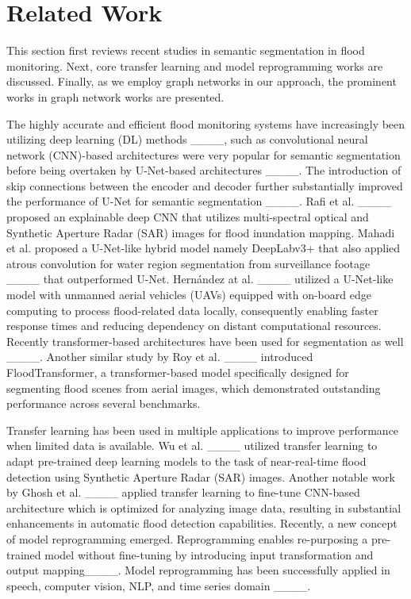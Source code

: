 \section{Related Work}
\label{sec:related}

This section first reviews recent studies in semantic segmentation in flood monitoring. Next, core transfer learning and model reprogramming works are discussed. Finally, as we employ graph networks in our approach, the prominent works in graph network works are presented.

The highly accurate and efficient flood monitoring systems have increasingly been utilizing deep learning (DL) methods ____, such as convolutional neural network (CNN)-based architectures were very popular for semantic segmentation before being overtaken by U-Net-based architectures ____. The introduction of skip connections between the encoder and decoder further substantially improved the performance of U-Net for semantic segmentation ____. Rafi et al. ____ proposed an explainable deep CNN that utilizes multi-spectral optical and Synthetic Aperture Radar (SAR) images for flood inundation mapping.  Mahadi et al. proposed a U-Net-like hybrid model namely DeepLabv3+ that also applied atrous convolution for water region segmentation from surveillance footage ____ that outperformed U-Net. Hern{\'a}ndez at al. ____ utilized a U-Net-like model with unmanned aerial vehicles (UAVs) equipped with on-board edge computing to process flood-related data locally, consequently enabling faster response times and reducing dependency on distant computational resources. Recently transformer-based architectures have been used for segmentation as well ____. Another similar study by Roy et al. ____ introduced FloodTransformer, a transformer-based model specifically designed for segmenting flood scenes from aerial images, which demonstrated outstanding performance across several benchmarks.  

Transfer learning has been used in multiple applications to improve performance when limited data is available. Wu et al. ____ utilized transfer learning to adapt pre-trained deep learning models to the task of near-real-time flood detection using Synthetic Aperture Radar (SAR) images. Another notable work by Ghosh et al. ____ applied transfer learning to fine-tune CNN-based architecture which is optimized for analyzing image data, resulting in substantial enhancements in automatic flood detection capabilities. Recently, a new concept of model reprogramming emerged. Reprogramming enables re-purposing a pre-trained model without fine-tuning by introducing input transformation and output mapping____. Model reprogramming has been successfully applied in speech, computer vision, NLP, and time series domain ____.

